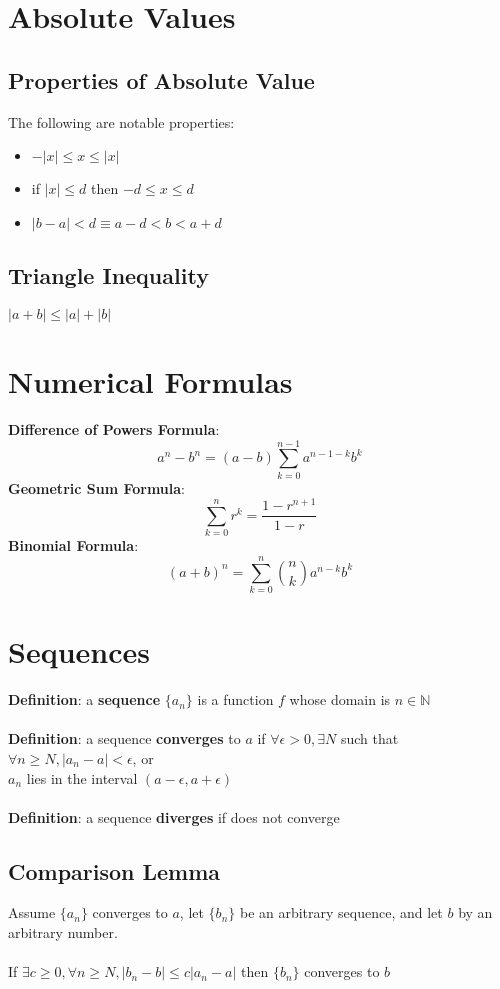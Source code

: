 \documentclass{article}
\begin{document}
  \section{Absolute Values}
  \subsection{Properties of Absolute Value}
  The following are notable properties:
  \begin{itemize}
    \item $-|x| \leq x \leq |x|$
    \item if $|x| \leq d$ then $-d \leq x \leq d$
    \item $|b-a| < d \equiv a-d < b < a + d$
  \end{itemize}
  \subsection{Triangle Inequality}
  $|a + b| \leq |a| + |b|$
  \section{Numerical Formulas}
  \textbf{Difference of Powers Formula}:
  \[a^n - b^n = (a-b)\sum_{k=0}^{n-1}a^{n-1-k}b^{k}\]
  \textbf{Geometric Sum Formula}:
  \[\sum_{k=0}^{n}r^k = \frac{1-r^{n+1}}{1-r}\]
  \textbf{Binomial Formula}:
  \[(a+b)^n = \sum_{k=0}^{n} \binom{n}{k}a^{n-k}b^k\]
  \section{Sequences}
  \textbf{Definition}: a \textbf{sequence} $\{a_n\}$ is a function $f$ whose domain is $n \in \mathbb{N}$ \\ \\
  \textbf{Definition}: a sequence \textbf{converges} to $a$ if $\forall \epsilon > 0, \exists N$ such that $\forall n \geq N, |a_n - a| < \epsilon$, or \\ 
  $a_n$ lies in the interval $(a - \epsilon, a + \epsilon)$ \\ \\
  \textbf{Definition}: a sequence \textbf{diverges} if does not converge
  \subsection{Comparison Lemma}
  Assume $\{a_n\}$ converges to $a$, let $\{b_n\}$ be an arbitrary sequence, and let $b$ by an arbitrary number. \\ \\
  If $\exists c \geq 0, \forall n \geq N, |b_n - b| \leq c|a_n - a|$ then $\{b_n\}$ converges to $b$
\end{document}
